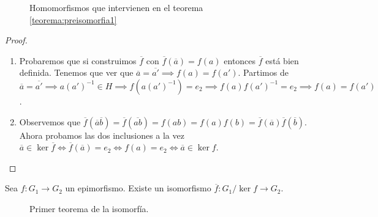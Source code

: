 \documentclass{book}
\theoremstyle{definition}
\theoremstyle{remark}
\newcommand{\inv}[1]{#1^{-1}}
\begin{document}
\begin{figure}[h]
\centering
{}
\caption{Homomorfismos que intervienen en el teorema \ref{teorema:preisomorfia1}}
\label{fig:otracosa}
\end{figure}

\begin{proof} $ $\newline
	\begin{enumerate}
		\item Probaremos que si construimos $\overline{f}$ con $\overline{f}(\overline{a}) = f(a)$ entonces $\overline{f}$ está bien definida. Tenemos que ver que $\overline{a} = \overline{a'} \implies f(a) = f(a')$. Partimos de $\overline{a} = \overline{a'} \implies a \inv{(a')} \in H \implies f(a \inv{(a')}) = e_2 \implies f(a) \inv{f(a')} = e_2 \implies f(a) = f(a')$.
		
		\item Observemos que $\overline{f}(\overline{a}\overline{b}) = \overline{f}(\overline{ab}) = f(ab) = f(a)f(b)=\overline{f}(\overline{a})\overline{f}(\overline{b})$. Ahora probamos las dos inclusiones a la vez $\overline{a} \in \ker \overline{f} \iff \overline{f}(\overline{a}) = e_2 \iff f(a) = e_2 \iff \overline{a} \in \ker f$.
	\end{enumerate}
\end{proof}

\begin{thm}
	Sea $f:G_1 \to G_2$ un epimorfismo. Existe un isomorfismo $\overline{f}: G_1 / \ker f \to G_2$.
\end{thm}

\begin{figure}[h]
	\centering
	\caption{Primer teorema de la isomorfía.}
	\label{fig:tmisomorfia3}
\end{figure}
\end{document}
